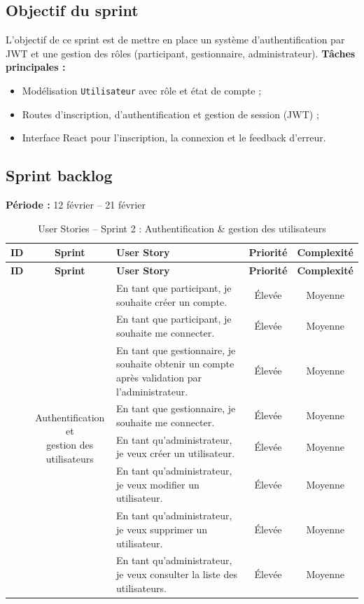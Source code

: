 \subsection{Objectif du sprint}
L'objectif de ce sprint est de mettre en place un système d'authentification par JWT et une gestion des rôles (participant, gestionnaire, administrateur).  
\textbf{Tâches principales :}
\begin{itemize}
  \item Modélisation \texttt{Utilisateur} avec rôle et état de compte ;
  \item Routes d'inscription, d'authentification et gestion de session (JWT) ;
  \item Interface React pour l'inscription, la connexion et le feedback d'erreur.
\end{itemize}

\subsection{Sprint backlog}
\noindent\textbf{Période :} 12 février – 21 février  
\begin{longtable}{|c|c|m{7cm}|c|c|}
  \caption{User Stories – Sprint 2 : Authentification \& gestion des utilisateurs} \\ \hline
  \textbf{ID} & \textbf{Sprint} & \textbf{User Story} & \textbf{Priorité} & \textbf{Complexité} \\ \hline
  \endfirsthead
  \hline
  \textbf{ID} & \textbf{Sprint} & \textbf{User Story} & \textbf{Priorité} & \textbf{Complexité} \\ \hline
  \endhead
  \hline\endfoot
  \hline\endlastfoot

  \multirow{8}{*}{2} 
  & \multirow{8}{*}{\parbox{3cm}{\centering Authentification et\\ gestion des utilisateurs}} 
  & En tant que participant, je souhaite créer un compte. 
  & Élevée & Moyenne \\ \cline{3-5}
  && En tant que participant, je souhaite me connecter. 
  & Élevée & Moyenne \\ \cline{3-5}
  && En tant que gestionnaire, je souhaite obtenir un compte après validation par l’administrateur. 
  & Élevée & Moyenne \\ \cline{3-5}
  && En tant que gestionnaire, je souhaite me connecter. 
  & Élevée & Moyenne \\ \cline{3-5}
  && En tant qu’administrateur, je veux créer un utilisateur. 
  & Élevée & Moyenne \\ \cline{3-5}
  && En tant qu’administrateur, je veux modifier un utilisateur. 
  & Élevée & Moyenne \\ \cline{3-5}
  && En tant qu’administrateur, je veux supprimer un utilisateur. 
  & Élevée & Moyenne \\ \cline{3-5}
  && En tant qu’administrateur, je veux consulter la liste des utilisateurs. 
  & Élevée & Moyenne \\
  \hline
\end{longtable}

